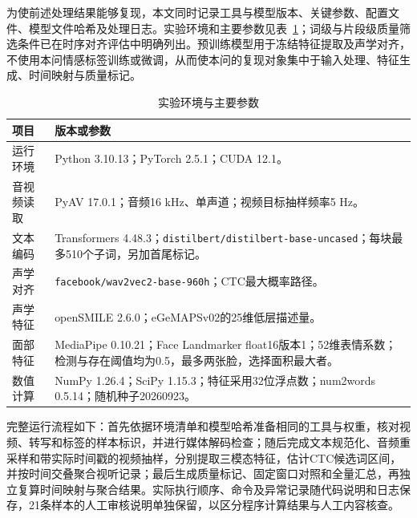 为使前述处理结果能够复现，本文同时记录工具与模型版本、关键参数、配置文件、模型文件哈希及处理日志。实验环境和主要参数见表~\ref{tab:p1_repro_settings}；词级与片段级质量筛选条件已在时序对齐评估中明确列出。预训练模型用于冻结特征提取及声学对齐，不使用本问情感标签训练或微调，从而使本问的复现对象集中于输入处理、特征生成、时间映射与质量标记。

\begin{table}[H]
    \centering\small
    \caption{实验环境与主要参数}
    \label{tab:p1_repro_settings}
    \setlength{\tabcolsep}{6pt}
    \renewcommand{\arraystretch}{1.12}
    \ifdefined\pOneCompactTableBox\else\newsavebox{\pOneCompactTableBox}\fi
    \begin{lrbox}{\pOneCompactTableBox}
    \begin{tabular}{l>{\raggedright\arraybackslash}p{27em}}
        \toprule
        项目 & 版本或参数\\
        \midrule
        运行环境 & Python 3.10.13；PyTorch 2.5.1；CUDA 12.1。\\
        音视频读取 & PyAV 17.0.1；音频16 kHz、单声道；视频目标抽样频率5 Hz。\\
        文本编码 & Transformers 4.48.3；\nolinkurl{distilbert/distilbert-base-uncased}；每块最多510个子词，另加首尾标记。\\
        声学对齐 & \nolinkurl{facebook/wav2vec2-base-960h}；CTC最大概率路径。\\
        声学特征 & openSMILE 2.6.0；eGeMAPSv02的25维低层描述量。\\
        面部特征 & MediaPipe 0.10.21；Face Landmarker float16版本1；52维表情系数；检测与存在阈值均为0.5，最多两张脸，选择面积最大者。\\
        数值计算 & NumPy 1.26.4；SciPy 1.15.3；特征采用32位浮点数；num2words 0.5.14；随机种子20260923。\\
        \bottomrule
    \end{tabular}
    \end{lrbox}
    \usebox{\pOneCompactTableBox}
\end{table}

完整运行流程如下：首先依据环境清单和模型哈希准备相同的工具与权重，核对视频、转写和标签的样本标识，并进行媒体解码检查；随后完成文本规范化、音频重采样和带实际时间戳的视频抽样，分别提取三模态特征，估计CTC候选词区间，并按时间交叠聚合视听记录；最后生成质量标记、固定窗口对照和全量汇总，再独立复算时间映射与聚合结果。实际执行顺序、命令及异常记录随代码说明和日志保存，21条样本的人工审核说明单独保留，以区分程序计算结果与人工内容核查。

